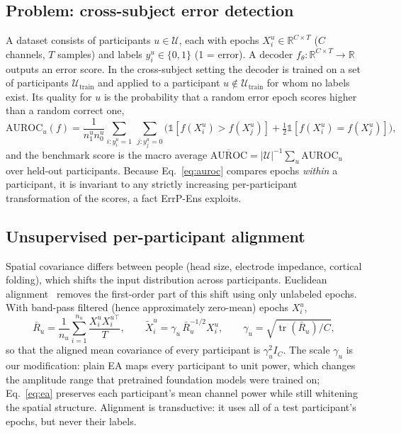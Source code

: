 \subsection{Problem: cross-subject error detection}
\label{sec:problem}
A dataset consists of participants $u\in\mathcal U$, each with epochs $X^u_i\in\mathbb R^{C\times T}$ ($C$
channels, $T$ samples) and labels $y^u_i\in\{0,1\}$ (1 = error). A decoder $f_\theta:\mathbb R^{C\times T}\to\mathbb R$
outputs an error score. In the cross-subject setting the decoder is trained on a set of participants
$\mathcal U_{\text{train}}$ and applied to a participant $u\notin\mathcal U_{\text{train}}$ for whom no labels
exist. Its quality for $u$ is the probability that a random error epoch scores higher than a random correct
one,
\begin{equation}
\mathrm{AUROC}_u(f)=\frac{1}{n^u_1 n^u_0}\sum_{i:y^u_i=1}\ \sum_{j:y^u_j=0}\Big(\mathbb 1[f(X^u_i)>f(X^u_j)]+\tfrac12\mathbb 1[f(X^u_i)=f(X^u_j)]\Big),
\label{eq:auroc}
\end{equation}
and the benchmark score is the macro average $\overline{\mathrm{AUROC}}=|\mathcal U|^{-1}\sum_u\mathrm{AUROC}_u$
over held-out participants. Because Eq.~\ref{eq:auroc} compares epochs \emph{within} a participant, it is
invariant to any strictly increasing per-participant transformation of the scores, a fact ErrP-Ens exploits.

\subsection{Unsupervised per-participant alignment}
\label{sec:ea}
Spatial covariance differs between people (head size, electrode impedance, cortical folding), which shifts
the input distribution across participants. Euclidean alignment~\citep{he2020transfer} removes the
first-order part of this shift using only unlabeled epochs. With band-pass filtered (hence approximately zero-mean) epochs $X^u_i$,
\begin{equation}
\bar R_u=\frac1{n_u}\sum_{i=1}^{n_u}\frac{X^u_i X^{u\top}_i}{T},\qquad
\tilde X^u_i=\gamma_u\,\bar R_u^{-1/2}X^u_i,\qquad
\gamma_u=\sqrt{\operatorname{tr}(\bar R_u)/C},
\label{eq:ea}
\end{equation}
so that the aligned mean covariance of every participant is $\gamma_u^2 I_C$. The scale $\gamma_u$ is our
modification: plain EA maps every participant to unit power, which changes the amplitude range that
pretrained foundation models were trained on; Eq.~\ref{eq:ea} preserves each participant's mean channel power
while still whitening the spatial structure. Alignment is transductive: it uses all of a test participant's
epochs, but never their labels.

